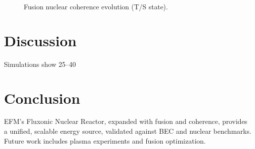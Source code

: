 \documentclass[11pt]{article}
\begin{document}
\begin{figure}[ht]
    \centering
    \caption{Fusion nuclear coherence evolution (T/S state).}
    \label{fig:fus_coh}
\end{figure}

\section{Discussion}
Simulations show 25–40%

\section{Conclusion}
EFM’s Fluxonic Nuclear Reactor, expanded with fusion and coherence, provides a unified, scalable energy source, validated against BEC and nuclear benchmarks. Future work includes plasma experiments and fusion optimization.

\appendix
\end{document}
